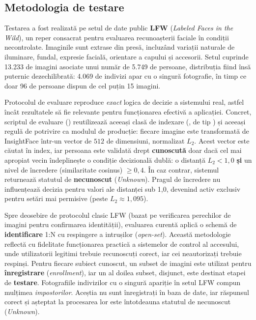 \documentclass[../../main.tex]{subfiles}
\begin{document}
\subsection{Metodologia de testare}
\label{subsec:metodologie_facial}

Testarea a fost realizată pe setul de date public \textbf{LFW} (\textit{Labeled Faces in the Wild}), un reper consacrat pentru evaluarea recunoașterii faciale în condiții necontrolate. Imaginile sunt extrase din presă, incluzând variații naturale de iluminare, fundal, expresie facială, orientare a capului și accesorii. Setul cuprinde 13.233 de imagini asociate unui număr de 5.749 de persoane, distribuția fiind însă puternic dezechilibrată: 4.069 de indivizi apar cu o singură fotografie, în timp ce doar 96 de persoane dispun de cel puțin 15 imagini.

Protocolul de evaluare reproduce \textit{exact} logica de decizie a sistemului real, astfel încât
rezultatele să fie relevante pentru funcționarea efectivă a aplicației. Concret, scriptul de
evaluare () reutilizează aceeași clasă de indexare
(, de tip ) și aceeași regulă de potrivire ca
modulul de producție: fiecare imagine este transformată de InsightFace într-un vector de $512$ de
dimensiuni, normalizat $L_2$. Acest vector este căutat în index, iar persoana este validată drept \textbf{cunoscută} doar dacă cel mai apropiat vecin îndeplinește o condiție decizională dublă: o distanță $L_2 < 1,0$ \textbf{și} un nivel de încredere (similaritate cosinus) $\geq 0,4$. În caz contrar, sistemul returnează statutul de \textbf{necunoscut} (\textit{Unknown}). Pragul de încredere nu influențează decizia pentru valori ale distanței sub 1,0, devenind activ exclusiv pentru setări mai permisive (peste $L_2 \approx 1,095$).

Spre deosebire de protocolul clasic LFW (bazat pe verificarea perechilor de imagini pentru confirmarea identității), evaluarea curentă aplică o schemă de \textbf{identificare} 1:N cu respingere a intrușilor (\textit{open-set}). Această metodologie reflectă cu fidelitate funcționarea practică a sistemelor de control al accesului, unde utilizatorii legitimi trebuie recunoscuți corect, iar cei neautorizați trebuie respinși. Pentru fiecare subiect cunoscut, un subset de imagini este utilizat pentru \textbf{înregistrare} (\textit{enrollment}), iar un al doilea subset, disjunct, este destinat etapei de \textbf{testare}. Fotografiile indivizilor cu o singură apariție în setul LFW compun mulțimea \textit{impostorilor}. Aceștia nu sunt înregistrați în baza de date, iar răspunsul corect și așteptat la procesarea lor este întotdeauna statutul de necunoscut (\textit{Unknown}).
\end{document}

